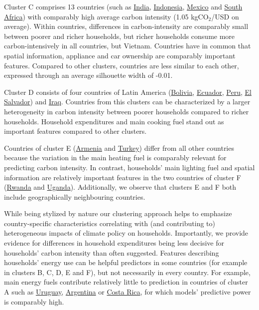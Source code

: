 \documentclass[12pt, a4paper]{article}
\begin{document}
Cluster C comprises 13 countries (such as \hyperref[fig:5b_IND]{India}, \hyperref[fig:5b_IDN]{Indonesia}, \hyperref[fig:5b_MEX]{Mexico} and \hyperref[fig:5b_ZAF]{South Africa}) with comparably high average carbon intensity (1.05 kgCO$_{2}$/USD on average). Within countries, differences in carbon-intensity are comparably small between poorer and richer households, but richer households consume more carbon-intensively in all countries, but Vietnam. Countries have in common that spatial information, appliance and car ownership are comparably important features. Compared to other clusters, countries are less similar to each other, expressed through an average silhouette width of -0.01. 

Cluster D consists of four countries of Latin America (\hyperref[fig:5b_BOL]{Bolivia}, \hyperref[fig:5b_ECU]{Ecuador}, \hyperref[fig:5b_PER]{Peru}, \hyperref[fig:5b_SLV]{El Salvador}) and \hyperref[fig:5b_IRQ]{Iraq}. Countries from this clusters can be characterized by a larger heterogeneity in carbon intensity between poorer households compared to richer households. Household expenditures and main cooking fuel stand out as important features compared to other clusters. 

Countries of cluster E (\hyperref[fig:5b_ARM]{Armenia} and \hyperref[fig:5b_TUR]{Turkey}) differ from all other countries because the variation in the main heating fuel is comparably relevant for predicting carbon intensity. In contrast, households' main lighting fuel and spatial information are relatively important features in the two countries of cluster F (\hyperref[fig:5b_RWA]{Rwanda} and \hyperref[fig:5b_UGA]{Uganda}). Additionally, we observe that clusters E and F both include geographically neighbouring countries.

While being stylized by nature our clustering approach helps to emphasize country-specific characteristics correlating with (and contributing to) heterogeneous impacts of climate policy on households. Importantly, we provide evidence for differences in household expenditures being less decisive for households' carbon intensity than often suggested. Features describing households' energy use can be helpful predictors in some countries (for example in clusters B, C, D, E and F), but not necessarily in every country. For example, main energy fuels contribute relatively little to prediction in countries of cluster A such as \hyperref[fig:5b_URY]{Uruguay}, \hyperref[fig:5b_URY]{Argentina} or \hyperref[fig:5b_CRI]{Costa Rica}, for which models' predictive power is comparably high.
\end{document}

